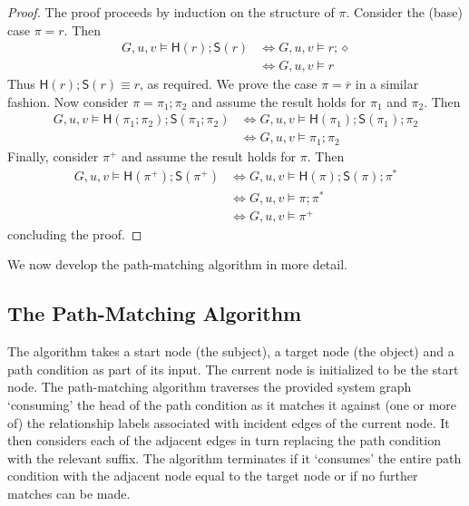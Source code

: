 \documentclass{article}
\newcommand{\hd}[1]{\mathsf{H}(#1)}
\newcommand{\tl}[1]{\mathsf{S}(#1)}
\newcommand{\comp}{\mathbin{;}}
\begin{document}
\begin{proof}
 The proof proceeds by induction on the structure of $\pi$.
 Consider the (base) case $\pi = r$. Then
  \begin{align*}
   G,u,v \models \hd{r} \comp \tl{r} &\Leftrightarrow G,u,v \models r \comp \diamond \\
				     &\Leftrightarrow G,u,v \models r
  \end{align*}
 Thus $\hd{r} \comp \tl{r} \equiv r$, as required.
 We prove the case $\pi = \overline{r}$ in a similar fashion.
 Now consider $\pi = \pi_1 \comp \pi_2$ and assume the result holds for $\pi_1$ and $\pi_2$.
 Then
  \begin{align*}
     G,u,v \models \hd{\pi_1 \comp \pi_2} \comp \tl{\pi_1 \comp \pi_2} &\Leftrightarrow G,u,v \models \hd{\pi_1} \comp \tl{\pi_1} \comp \pi_2  \\ &\Leftrightarrow G,u,v \models \pi_1 \comp \pi_2 \end{align*}
 Finally, consider $\pi^+$ and assume the result holds for $\pi$.
 Then
  \begin{align*}
   G,u,v \models \hd{\pi^+} \comp \tl{\pi^+} &\Leftrightarrow G,u,v \models \hd{\pi} \comp \tl{\pi} \comp \pi^* \\ &\Leftrightarrow G,u,v \models \pi \comp \pi^* \\ &\Leftrightarrow G,u,v \models \pi^+
  \end{align*}
 concluding the proof.
\end{proof}

We now develop the path-matching algorithm in more detail.

\subsection{The Path-Matching Algorithm}\label{sec:Algorithm:Description}

The algorithm takes a start node (the subject), a target node (the object) and a path condition as part of its input.
The current node is initialized to be the start node.
The path-matching algorithm traverses the provided system graph `consuming' the head of the path condition as it matches it against (one or more of) the relationship labels associated with incident edges of the current node.
It then considers each of the adjacent edges in turn replacing the path condition with the relevant suffix.
The algorithm terminates if it `consumes' the entire path condition with the adjacent node equal to the target node or if no further matches can be made.
\end{document}
